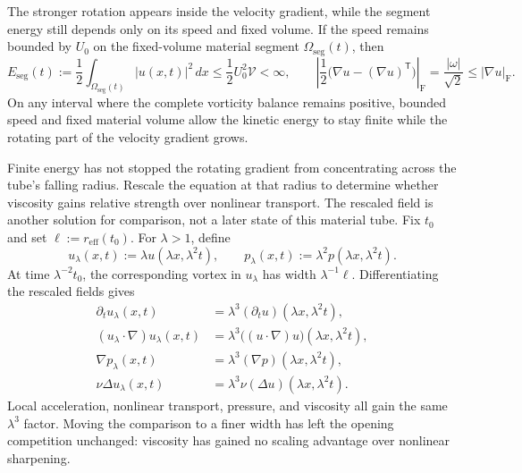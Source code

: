 The stronger rotation appears inside the velocity gradient, while the segment energy still depends only on its speed and fixed volume.
If the speed remains bounded by \(U_0\) on the fixed-volume material segment \(\Omega_{\mathrm{seg}}(t)\), then
\[
  E_{\mathrm{seg}}(t)
  :=
  \frac12\int_{\Omega_{\mathrm{seg}}(t)}|u(x,t)|^2\,dx
  \leq
  \frac12U_0^2\mathcal V
  <
  \infty,
  \qquad
  \left|\frac12\bigl(\nabla u-(\nabla u)^{\mathsf T}\bigr)\right|_{\mathrm F}
  =
  \frac{|\omega|}{\sqrt2}
  \leq
  |\nabla u|_{\mathrm F}.
\]
On any interval where the complete vorticity balance remains positive, bounded speed and fixed material volume allow the kinetic energy to stay finite while the rotating part of the velocity gradient grows.


Finite energy has not stopped the rotating gradient from concentrating across the tube's falling radius.
Rescale the equation at that radius to determine whether viscosity gains relative strength over nonlinear transport.
The rescaled field is another solution for comparison, not a later state of this material tube.
Fix \(t_0\) and set \(\ell:=r_{\mathrm{eff}}(t_0)\).
For \(\lambda>1\), define
\[
  u_\lambda(x,t)
  :=
  \lambda u(\lambda x,\lambda^2t),
  \qquad
  p_\lambda(x,t)
  :=
  \lambda^2p(\lambda x,\lambda^2t).
\]
At time \(\lambda^{-2}t_0\), the corresponding vortex in \(u_\lambda\) has width \(\lambda^{-1}\ell\).
Differentiating the rescaled fields gives
\[
\begin{aligned}
  \partial_tu_\lambda(x,t)
  &=
  \lambda^3(\partial_tu)(\lambda x,\lambda^2t),
  \\
  (u_\lambda\cdot\nabla)u_\lambda(x,t)
  &=
  \lambda^3\bigl((u\cdot\nabla)u\bigr)(\lambda x,\lambda^2t),
  \\
  \nabla p_\lambda(x,t)
  &=
  \lambda^3(\nabla p)(\lambda x,\lambda^2t),
  \\
  \nu\Delta u_\lambda(x,t)
  &=
  \lambda^3\nu(\Delta u)(\lambda x,\lambda^2t).
\end{aligned}
\]
Local acceleration, nonlinear transport, pressure, and viscosity all gain the same \(\lambda^3\) factor.
Moving the comparison to a finer width has left the opening competition unchanged: viscosity has gained no scaling advantage over nonlinear sharpening.


